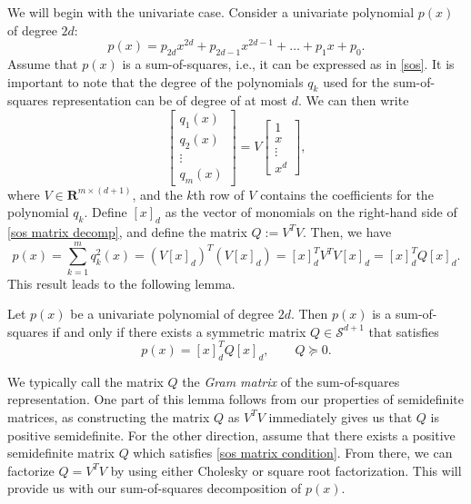 	We will begin with the univariate case. Consider a univariate polynomial $p(x)$ of degree $2d$:
	\begin{equation}
		p(x) = p_{2d}x^{2d} + p_{2d-1}x^{2d-1} + \dots + p_1 x + p_0.
	\end{equation}
	Assume that $p(x)$ is a sum-of-squares, i.e., it can be expressed as in \eqref{sos}. It is important to note that the degree of the polynomials $q_k$ used for the sum-of-squares representation can be of degree of at most $d$. We can then write
	\begin{equation} \label{sos matrix decomp}
		\begin{bmatrix}
		q_1 (x) \\ q_2 (x) \\ \vdots \\ q_m (x)
		\end{bmatrix}
		=
		V \begin{bmatrix}
		1 \\ x \\ \vdots \\ x^d
		\end{bmatrix},
	\end{equation}
	where $V \in \mathbf{R}^{m \times (d+1)}$, and the $k$th row of $V$ contains the coefficients for the polynomial $q_k$. Define $[x]_d$ as the vector of monomials on the right-hand side of \eqref{sos matrix decomp}, and define the matrix $Q := V^T V$. Then, we have
	$$
	p(x) = \sum_{k=1}^{m} q_k^2 (x) = (V[x]_d)^T (V[x]_d) = [x]_d^T V^T V [x]_d = [x]_d^T Q [x]_d.
	$$
	This result leads to the following lemma.
	\begin{lemma}
		Let $p(x)$ be a univariate polynomial of degree $2d$. Then $p(x)$ is a sum-of-squares if and only if there exists a symmetric matrix $Q \in \mathcal{S}^{d+1}$ that satisfies
		\begin{equation} \label{sos matrix condition}
		p(x) = [x]_d^T Q [x]_d, \qquad Q \succeq 0.
		\end{equation}
	\end{lemma}
	
	We typically call the matrix $Q$ the \emph{Gram matrix} of the sum-of-squares representation. One part of this lemma follows from our properties of semidefinite matrices, as constructing the matrix $Q$ as $V^T V$ immediately gives us that $Q$ is positive semidefinite. For the other direction, assume that there exists a positive semidefinite matrix $Q$ which satisfies \eqref{sos matrix condition}. From there, we can factorize $Q = V^T V$ by using either Cholesky or square root factorization. This will provide us with our sum-of-squares decomposition of $p(x)$. 
	
